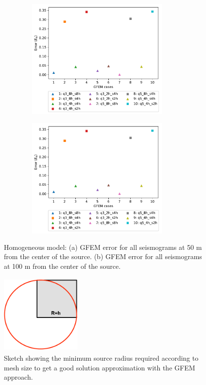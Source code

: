  \begin{figure}[h!]
 		\centering
		\begin{subfigure}{8cm}
				\includegraphics[width=8cm, height=6cm]{Thesis_Edith/figures/homo/homo_waves/error_gfem_50m.pdf} 
			     \caption{}
		\end{subfigure}
        \hspace{0.25cm}
		\begin{subfigure}{8cm}
				\includegraphics[width=8cm, height=6cm]{Thesis_Edith/figures/homo/homo_waves/error_gfem_50m.pdf}
			   \caption{}
		\end{subfigure}
 
	\caption{Homogeneous model: (a) GFEM error  for all  seismograms at 50 m from the center of the source. (b) GFEM error for all seismograms at 100 m from the center of the source.}  
	\label{fig:3.3}
\end{figure}


 \begin{figure}[h!]
	\centering
	\includegraphics[width=4cm, height=4cm]{figures/source_size.pdf}
	\caption{Sketch showing the minimum source radius required according to mesh size to get a good solution approximation with the GFEM approach.}
	\label{fig:3.4}
\end{figure}

